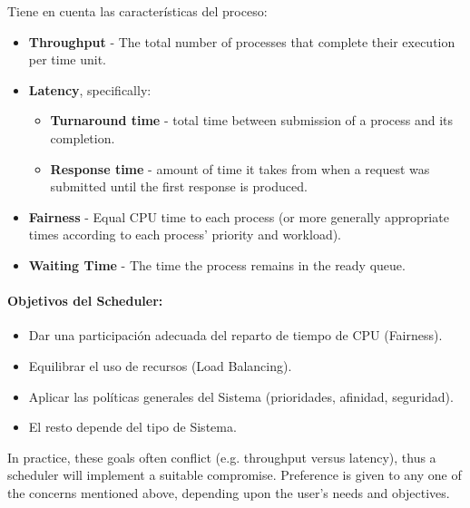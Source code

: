 \documentclass[a4paper, twoside]{article}
\begin{document}
Tiene en cuenta las características del proceso:

\begin{itemize}
	\item \textbf{Throughput} - The total number of processes that complete their execution per time unit.
	\item \textbf{Latency}, specifically:
	\begin{itemize}
		\item \textbf{Turnaround time} - total time between submission of a process and its completion.
		\item \textbf{Response time} - amount of time it takes from when a request was submitted until the first response is produced.
	\end{itemize}
	\item \textbf{Fairness} - Equal CPU time to each process (or more generally appropriate times according to each process' priority and workload).
	\item \textbf{Waiting Time} - The time the process remains in the ready queue.
\end{itemize}

\paragraph{Objetivos del Scheduler:}
\begin{itemize}
	\item Dar una participación adecuada del reparto de tiempo de CPU (Fairness).
	\item Equilibrar el uso de recursos (Load Balancing).
	\item Aplicar las políticas generales del Sistema (prioridades, afinidad, seguridad).
	\item El resto depende del tipo de Sistema.
\end{itemize}

In practice, these goals often conflict (e.g. throughput versus latency), thus a scheduler will implement a suitable compromise. Preference is given to any one of the concerns mentioned above, depending upon the user's needs and objectives.
\end{document}
